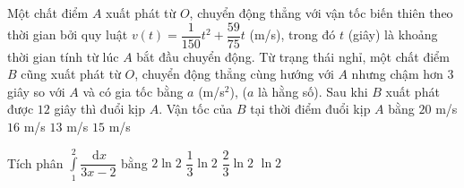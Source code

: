\begin{ex}%
	Một chất điểm $A$ xuất phát từ $O$, chuyển động thẳng với vận tốc biến thiên theo thời gian bởi quy luật $v(t)=\dfrac{1}{150}t^2+\dfrac{59}{75}t$ (m/s), trong đó $t$ (giây) là khoảng thời gian tính từ lúc $A$ bắt đầu chuyển động. Từ trạng thái nghỉ, một chất điểm $B$ cũng xuất phát từ $O$, chuyển động thẳng cùng hướng với $A$ nhưng chậm hơn $ 3 $ giây so với $A$ và có gia tốc bằng $a$ (m/s$^2$), ($a$ là hằng số). Sau khi $B$ xuất phát được $ 12 $ giây thì đuổi kịp $A$. Vận tốc của $B$ tại thời điểm đuổi kịp $A$ bằng
	\choice
	{$20$ m/s}
	{\True $16$ m/s}
	{$13$ m/s}
	{$15$ m/s}
\end{ex}
\begin{ex}%
	Tích phân $\displaystyle\int\limits_1^2\dfrac{\mathrm{\,d}x}{3x-2}$ bằng
	\choice
	{$2\ln 2$}
	{$\dfrac{1}{3}\ln 2$}
	{\True $\dfrac{2}{3}\ln 2$}
	{$\ln 2$}
\end{ex}

